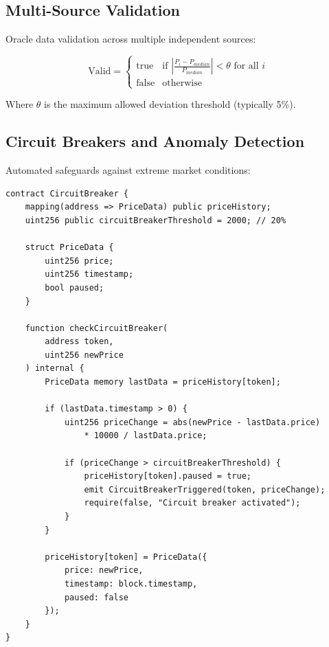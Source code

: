 \subsection{Multi-Source Validation}

Oracle data validation across multiple independent sources:

\begin{equation}
\text{Valid} = \begin{cases}
    \text{true} & \text{if } |\frac{P_i - P_{median}}{P_{median}}| < \theta \text{ for all } i \\
    \text{false} & \text{otherwise}
\end{cases}
\end{equation}

Where $\theta$ is the maximum allowed deviation threshold (typically 5\%).

\subsection{Circuit Breakers and Anomaly Detection}

Automated safeguards against extreme market conditions:

\begin{lstlisting}[caption={Circuit Breaker Implementation}]
contract CircuitBreaker {
    mapping(address => PriceData) public priceHistory;
    uint256 public circuitBreakerThreshold = 2000; // 20%
    
    struct PriceData {
        uint256 price;
        uint256 timestamp;
        bool paused;
    }
    
    function checkCircuitBreaker(
        address token,
        uint256 newPrice
    ) internal {
        PriceData memory lastData = priceHistory[token];
        
        if (lastData.timestamp > 0) {
            uint256 priceChange = abs(newPrice - lastData.price) 
                * 10000 / lastData.price;
                
            if (priceChange > circuitBreakerThreshold) {
                priceHistory[token].paused = true;
                emit CircuitBreakerTriggered(token, priceChange);
                require(false, "Circuit breaker activated");
            }
        }
        
        priceHistory[token] = PriceData({
            price: newPrice,
            timestamp: block.timestamp,
            paused: false
        });
    }
}
\end{lstlisting}


